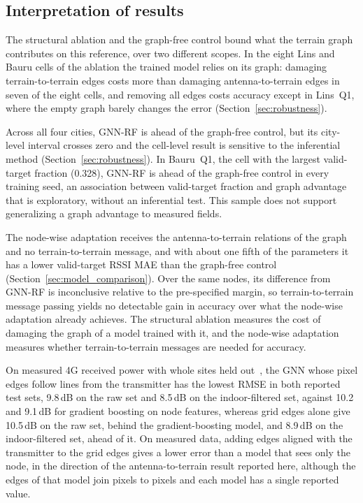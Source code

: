 \documentclass{ieeeaccess}
\begin{document}
\subsection{Interpretation of results}

The structural ablation and the graph-free control bound what the terrain graph contributes on this reference, over two different scopes. In the eight Lins and Bauru cells of the ablation the trained model relies on its graph: damaging terrain-to-terrain edges costs more than damaging antenna-to-terrain edges in seven of the eight cells, and removing all edges costs accuracy except in Lins~Q1, where the empty graph barely changes the error (Section~\ref{sec:robustness}).

Across all four cities, GNN-RF is ahead of the graph-free control, but its city-level interval crosses zero and the cell-level result is sensitive to the inferential method (Section~\ref{sec:robustness}). In Bauru~Q1, the cell with the largest valid-target fraction (0.328), GNN-RF is ahead of the graph-free control in every training seed, an association between valid-target fraction and graph advantage that is exploratory, without an inferential test. This sample does not support generalizing a graph advantage to measured fields.

The node-wise adaptation receives the antenna-to-terrain relations of the graph and no terrain-to-terrain message, and with about one fifth of the parameters it has a lower valid-target RSSI MAE than the graph-free control (Section~\ref{sec:model_comparison}). Over the same nodes, its difference from GNN-RF is inconclusive relative to the pre-specified margin, so terrain-to-terrain message passing yields no detectable gain in accuracy over what the node-wise adaptation already achieves. The structural ablation measures the cost of damaging the graph of a model trained with it, and the node-wise adaptation measures whether terrain-to-terrain messages are needed for accuracy.

On measured 4G received power with whole sites held out~\cite{bufort2025data}, the GNN whose pixel edges follow lines from the transmitter has the lowest RMSE in both reported test sets, 9.8\,dB on the raw set and 8.5\,dB on the indoor-filtered set, against 10.2 and 9.1\,dB for gradient boosting on node features, whereas grid edges alone give 10.5\,dB on the raw set, behind the gradient-boosting model, and 8.9\,dB on the indoor-filtered set, ahead of it. On measured data, adding edges aligned with the transmitter to the grid edges gives a lower error than a model that sees only the node, in the direction of the antenna-to-terrain result reported here, although the edges of that model join pixels to pixels and each model has a single reported value.
\end{document}

